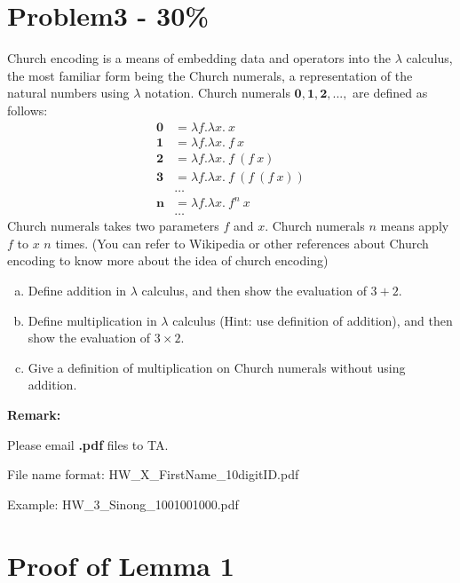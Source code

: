 \documentclass{article}
\begin{document}
\section*{Problem3 - 30\%}

Church encoding is a means of embedding data and operators into the $\lambda$ calculus, the most familiar form being the Church numerals, a representation of the natural numbers using $\lambda$ notation. 
Church numerals $\mathbf{0}, \mathbf{1}, \mathbf{2}, ...,$ are defined as follows:
\begin{align*}
    \mathbf{0} &= \lambda f.\lambda x.\ x \\
    \mathbf{1} &= \lambda f.\lambda x.\ f\ x \\
    \mathbf{2} &= \lambda f.\lambda x.\ f\ (f\ x) \\
    \mathbf{3} &= \lambda f.\lambda x.\ f\ (f\ (f\ x)) \\
    &\dots \\
    \mathbf{n} &= \lambda f.\lambda x.\ f^n\ x \\
    &\dots
\end{align*}
Church numerals takes two parameters $f$ and $x$. Church numerals $n$ means apply $f$ to $x$ $n$ times.
(You can refer to Wikipedia or other references about Church encoding to know more about the idea of church encoding)
\begin{enumerate}[(a)]
    \item Define addition in $\lambda$ calculus, and then show the evaluation of $3+2$.
    \item Define multiplication in $\lambda$ calculus (Hint: use definition of addition), and then show the evaluation of $3\times2$.
    \item Give a definition of multiplication on Church numerals without using addition.
\end{enumerate}

\vspace{20pt}

\textbf{Remark:} 

Please email \textbf{.pdf} files to TA.

File name format: {\color{red} HW\_X\_FirstName\_10digitID.pdf}

Example: {HW\_3\_Sinong\_1001001000.pdf}

\newpage

\appendix
\renewcommand{\appendixname}{Appendix~\Alph{section}}

\section{Proof of Lemma 1}
\end{document}
